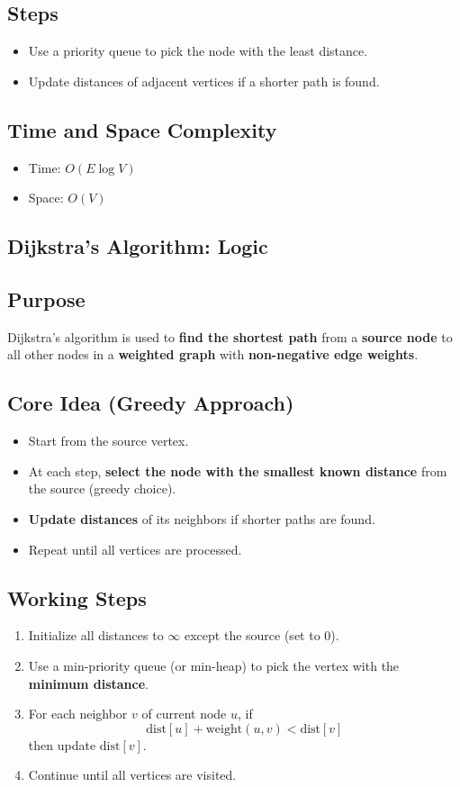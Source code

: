 \documentclass[a4paper,14pt]{extarticle}
\begin{document}
\subsection*{Steps}
\begin{itemize}
    \item Use a priority queue to pick the node with the least distance.
    \item Update distances of adjacent vertices if a shorter path is found.
\end{itemize}

\subsection*{Time and Space Complexity}
\begin{itemize}
    \item Time: $O(E \log V)$
    \item Space: $O(V)$
\end{itemize}

\subsection{Dijkstra's Algorithm: Logic}
\subsection*{Purpose}
Dijkstra’s algorithm is used to \textbf{find the shortest path} from a \textbf{source node} to all other nodes in a \textbf{weighted graph} with \textbf{non-negative edge weights}.

\subsection*{Core Idea (Greedy Approach)}
\begin{itemize}
    \item Start from the source vertex.
    \item At each step, \textbf{select the node with the smallest known distance} from the source (greedy choice).
    \item \textbf{Update distances} of its neighbors if shorter paths are found.
    \item Repeat until all vertices are processed.
\end{itemize}

\subsection*{Working Steps}
\begin{enumerate}
    \item Initialize all distances to $\infty$ except the source (set to 0).
    \item Use a min-priority queue (or min-heap) to pick the vertex with the \textbf{minimum distance}.
    \item For each neighbor $v$ of current node $u$, if 
    \[
    \text{dist}[u] + \text{weight}(u, v) < \text{dist}[v]
    \]
    then update $\text{dist}[v]$.
    \item Continue until all vertices are visited.
\end{enumerate}
\end{document}
